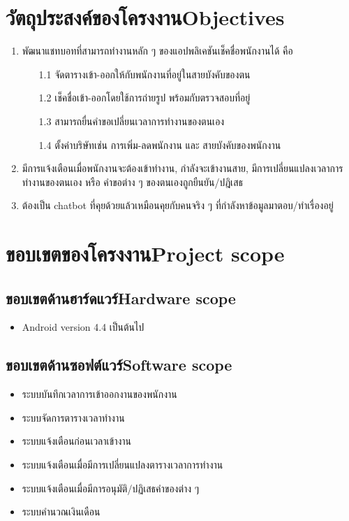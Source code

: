 \section{\ifcpe วัตถุประสงค์ของโครงงาน\else Objectives\fi}
\begin{enumerate}
    \item พัฒนาแชทบอทที่สามารถทำงานหลัก ๆ ของแอปพลิเคชันเช็คชื่อพนักงานได้ คือ 
    \begin{enumerate}
    \item[1.1] จัดตารางเข้า-ออกให้กับพนักงานที่อยู่ในสายบังคับของตน
    \item[1.2] เช็คชื่อเข้า-ออกโดยใช้การถ่ายรูป พร้อมกับตรวจสอบที่อยู่ 
    \item[1.3] สามารถยื่นคำขอเปลี่ยนเวลาการทำงานของตนเอง
    \item[1.4] ตั้งค่าบริษัทเช่น การเพิ่ม-ลดพนักงาน และ สายบังคับของพนักงาน 
    \end{enumerate} 
    \item มีการแจ้งเตือนเมื่อพนักงานจะต้องเข้าทำงาน, กำลังจะเข้างานสาย, มีการเปลี่ยนแปลงเวลาการทำงานของตนเอง หรือ คำขอต่าง ๆ ของตนเองถูกยืนยัน/ปฎิเสธ
    \item ต้องเป็น chatbot ที่คุยด้วยแล้วเหมือนคุยกับคนจริง ๆ ที่กำลังหาข้อมูลมาตอบ/ทำเรื่องอยู่
\end{enumerate}

\section{\ifcpe ขอบเขตของโครงงาน\else Project scope\fi}

\subsection{\ifcpe ขอบเขตด้านฮาร์ดแวร์\else Hardware scope\fi}
\begin{itemize}
    \item Android version 4.4 เป็นต้นไป
\end{itemize}

\subsection{\ifcpe ขอบเขตด้านซอฟต์แวร์\else Software scope\fi}
\begin{itemize}
    \item ระบบบันทึกเวลาการเข้าออกงานของพนักงาน
    \item ระบบจัดการตารางเวลาทำงาน 
    \item ระบบแจ้งเตือนก่อนเวลาเข้างาน
    \item ระบบแจ้งเตือนเมื่อมีการเปลี่ยนแปลงตารางเวลาการทำงาน
    \item ระบบแจ้งเตือนเมื่อมีการอนุมัติ/ปฏิเสธคำของต่าง ๆ
    \item ระบบคำนวณเงินเดือน
\end{itemize}

